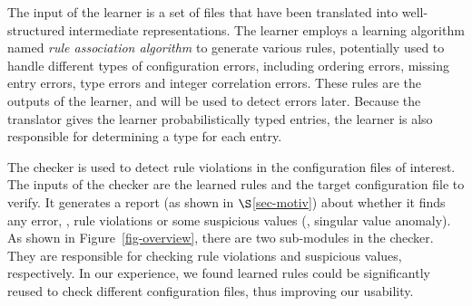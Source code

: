 The input of the learner is a set of files that have been translated
into well-structured intermediate representations. 
The learner employs a learning algorithm named {\em rule association 
algorithm} to generate various rules,
potentially used to handle different types of configuration errors,
including ordering errors, missing entry errors,
type errors and integer correlation errors.
These rules are the outputs of the learner, 
and will be used to detect errors later.
Because the translator gives the learner probabilistically typed entries,
the learner is also responsible for determining a type for each entry.

The checker is used to detect rule violations in the configuration
files of interest. The inputs of the checker are the learned rules 
and the target configuration file to verify.
It generates a report (as shown in $\S$\ref{sec-motiv}) about 
whether it finds any error, \eg, rule violations 
or some suspicious values (\eg, singular value anomaly).
As shown in Figure~\ref{fig-overview},
there are two sub-modules in the checker. They are responsible for
checking rule violations and suspicious values, respectively.
In our experience, we found learned rules could be significantly reused
to check different configuration files, thus improving our usability.  
